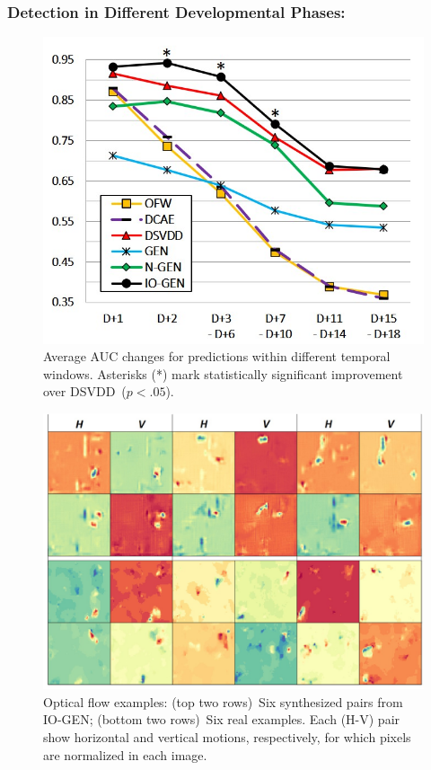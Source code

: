 \documentclass[letterpaper]{article} %
\begin{document}
\subsubsection{Detection in Different Developmental Phases:}
\label{sec:detection_in_different_developmental_phases}

\begin{figure}[t]
	\centering
	\includegraphics[width=.75\columnwidth]{auc_less_data}
	\caption{
		Average AUC changes for predictions within different temporal
		windows.
        Asterisks (*) mark statistically significant improvement over
		DSVDD~($p<.05$).
	}
	\label{fig:auc_less_data}
\end{figure}
%
\begin{figure}\centering
       \includegraphics[width=.75\linewidth]{real_fake_flows}
       \caption{Optical flow examples:
           (top two rows)~Six synthesized pairs from \mbox{IO-GEN};
           (bottom two rows)~Six real examples.
           Each (H-V) pair show horizontal and vertical motions,
           respectively, for which pixels are normalized in each image.
       }
       \label{fig:real_fake_flows}
\end{figure}
\end{document}
